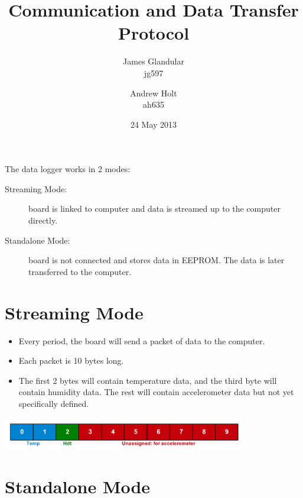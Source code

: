 \documentclass[a4paper,11pt]{article}  %
\title{Communication and Data Transfer Protocol}
\author{James Glandular\\ jg597 \and Andrew Holt\\ ah635}
\date{24 May 2013}
\begin{document}
\maketitle

\noindent The data logger works in 2 modes:

\begin{description}
  \item[Streaming Mode:] board is linked to computer and data is
    streamed up to the computer directly.
  \item[Standalone Mode:] board is not connected and stores data in
    EEPROM. The data is later transferred to the computer.
\end{description}

\section{Streaming Mode}

\begin{itemize}
  \item Every period, the board will send a packet of data to the
    computer.
  \item Each packet is 10 bytes long.
  \item The first 2 bytes will contain temperature data, and the third
    byte will contain humidity data. The rest will contain
    accelerometer data but not yet specifically defined.
\end{itemize}

\begin{center}
  \includegraphics[width=0.8\textwidth]{Packet_diagram.pdf}
\end{center}

\section{Standalone Mode}

\begin{itemize}

\end{itemize}
\end{document}
